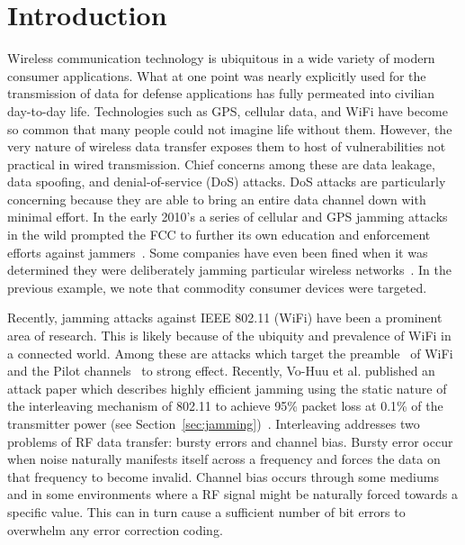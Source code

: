 \documentclass[sigconf]{acmart}
\begin{document}


\maketitle

\section{Introduction}

Wireless communication technology is ubiquitous in a wide variety of modern consumer applications. What at one point was nearly explicitly used for the transmission of data for defense applications has fully permeated into civilian day-to-day life. Technologies such as GPS, cellular data, and WiFi have become so common that many people could not imagine life without them. However, the very nature of wireless data transfer exposes them to host of vulnerabilities not practical in wired transmission. Chief concerns among these are data leakage, data spoofing, and denial-of-service (DoS) attacks. DoS attacks are particularly concerning because they are able to bring an entire data channel down with minimal effort. In the early 2010's a series of cellular and GPS jamming attacks in the wild prompted the FCC to further its own education and enforcement efforts against jammers~\cite{FCC2011enforcement}. Some companies have even been fined when it was determined they were deliberately jamming particular wireless networks~\cite{FCC2014marriott}.  In the previous example, we note that commodity consumer devices were targeted.  

Recently, jamming attacks against IEEE 802.11 (WiFi) have been a prominent area of research. This is likely because of the ubiquity and prevalence of WiFi in a connected world. Among these are attacks which target the preamble~\cite{mueller2013efficient, la2013phase} of WiFi and the Pilot channels~\cite{clancy2011efficient} to strong effect. Recently, Vo-Huu et al. published an attack paper which describes highly efficient jamming using the static nature of the interleaving mechanism of 802.11 to achieve 95\% packet loss at 0.1\% of the transmitter power (see Section~\ref{sec:jamming})~\cite{vo2016interleaving}. Interleaving addresses two problems of RF data transfer: bursty errors and channel bias. Bursty error occur when noise naturally manifests itself across a frequency and forces the data on that frequency to become invalid. Channel bias occurs through some mediums and in some environments where a RF signal might be naturally forced towards a specific value. This can in turn cause a sufficient number of bit errors to overwhelm any error correction coding.
\end{document}
